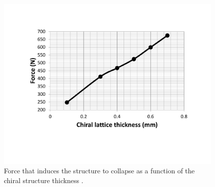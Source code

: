       \begin{figure}[!htpb] %
        \centering
        \includegraphics[width=0.8 \textwidth]{figures/result-sim/chiral_t/force_chiral_t}
        \caption[Force that induces the structure to collapse as a function of the chiral structure thickness]{Force that induces the structure to collapse as a function of the chiral structure thickness \chit.}\label{fig:force_chiral_t}
      \end{figure} 